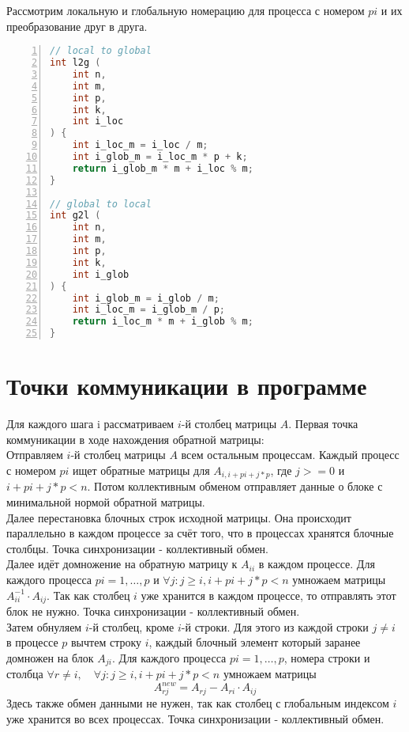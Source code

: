 \documentclass[a4paper,12pt]{article}
\begin{document}
\quad Рассмотрим локальную и глобальную номерацию для процесса с номером $pi$ и их преобразование друг в друга.

\begin{lstlisting}[language=C++,
tabsize=2,
stepnumber=1,
numbers=left,
 commentstyle=\itshape \color{TRE},
backgroundcolor=\color{backcolour},
basicstyle=\ttfamily\small,
frame=single,
breaklines=true,   
breakatwhitespace=true,
emphstyle=\itshape,
keywordstyle=\color{blue} ]
// local to global
int l2g (
	int n,
	int m,
	int p,
	int k,
	int i_loc
) { 
	int i_loc_m = i_loc / m;
	int i_glob_m = i_loc_m * p + k;
	return i_glob_m * m + i_loc % m;
}

// global to local
int g2l (
	int n,
	int m,
	int p,
	int k,
	int i_glob
) {
	int i_glob_m = i_glob / m;
	int i_loc_m = i_glob_m / p;
	return i_loc_m * m + i_glob % m;
}
\end{lstlisting}
\newpage

\section{Точки коммуникации в программе}
Для каждого шага i рассматриваем $i$-й столбец матрицы $A$.
Первая точка коммуникации в ходе нахождения обратной матрицы: \\
Отправляем $i$-й столбец матрицы $A$ всем остальным процессам. Каждый процесс с номером $pi$ ищет обратные матрицы для $A_{i, i + pi + j * p}$, где $j >= 0$ и $i + pi + j * p < n$. Потом коллективным обменом отправляет данные о блоке с минимальной нормой обратной матрицы. \\

Далее перестановка блочных строк исходной матрицы. Она происходит параллельно в каждом процессе за счёт того, что в процессах хранятся блочные столбцы. Точка синхронизации - коллективный обмен.\\

Далее идёт домножение на обратную матрицу к $A_{ii}$ в каждом процессе. Для каждого процесса $pi=1,\dots,p$ и $\forall j: j \geq i, i + pi + j * p < n$ умножаем матрицы $A_{ii}^{-1} \cdot A_{ij}$.
Так как столбец $i$ уже хранится в каждом процессе, то отправлять этот блок не нужно. Точка синхронизации - коллективный обмен.\\


Затем обнуляем $i$-й столбец, кроме $i$-й строки. Для этого из каждой строки $j \neq i$ в процессе $p$ вычтем строку $i$, каждый блочный элемент который заранее домножен на блок $A_{ji}$. Для каждого процесса $pi=1,\dots,p$, номера строки и столбца $\forall r \neq i, \quad \forall j: j \geq i, i + pi + j * p < n$ умножаем матрицы $$A_{rj}^{new} = A_{rj} - A_{ri} \cdot A_{ij}$$
Здесь также обмен данными не нужен, так как столбец с глобальным индексом $i$ уже хранится во всех процессах. Точка синхронизации - коллективный обмен. \\
\end{document}
